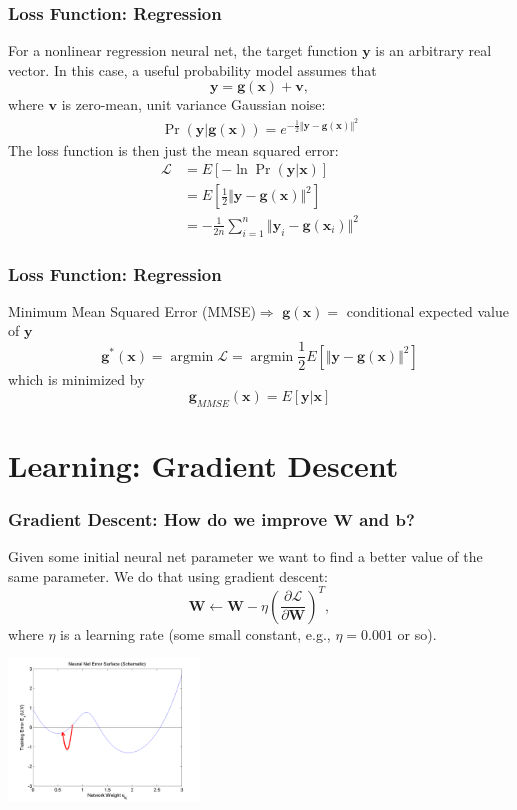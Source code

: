\documentclass{beamer}
\DeclareMathOperator*{\argmin}{argmin}
\begin{document}
\begin{frame}
  \frametitle{Loss Function: Regression}

  For a nonlinear regression neural net, the target function
  $\mathbf{y}$ is an arbitrary real vector.  In this case, a useful
  probability model assumes that
  \begin{displaymath}
    \mathbf{y}=\mathbf{g}(\mathbf{x})+\mathbf{v},
  \end{displaymath}
  where $\mathbf{v}$ is zero-mean, unit variance Gaussian noise:
  \begin{align*}
    \Pr(\mathbf{y}|\mathbf{g}(\mathbf{x}))=
    e^{-\frac{1}{2}\Vert\mathbf{y}-\mathbf{g}(\mathbf{x})\Vert^2}
  \end{align*}
  The loss function is then just the mean squared error:
  \begin{align*}
    \mathcal{L}
    &= E\left[-\ln\Pr(\mathbf{y}|\mathbf{x})\right]\\
    &= E\left[\frac{1}{2}\Vert\mathbf{y}-\mathbf{g}(\mathbf{x})\Vert^2\right]\\
    &= -\frac{1}{2n}\sum_{i=1}^n\Vert\mathbf{y}_i-\mathbf{g}(\mathbf{x}_i)\Vert^2
  \end{align*}
\end{frame}
  
\begin{frame}
  \frametitle{Loss Function: Regression}
  \begin{block}{Minimum Mean Squared Error (MMSE)$\Rightarrow$ $\mathbf{g}(\mathbf{x})=$ conditional expected value of $\mathbf{y}$}
    \[
    \mathbf{g}^*(\mathbf{x})=\argmin {\mathcal L} = 
    \argmin\frac{1}{2}E\left[\Vert\mathbf{y}-\mathbf{g}(\mathbf{x})\Vert^2\right]
    \]
    which is minimized by
    \[
    \mathbf{g}_{MMSE}(\mathbf{x})=E\left[\mathbf{y}|\mathbf{x}\right]
    \]
  \end{block}
\end{frame}

\section[Learning]{Learning: Gradient Descent}
\setcounter{subsection}{1}

\begin{frame}
  \frametitle{Gradient Descent: How do we improve $\mathbf{W}$ and $\mathbf{b}$?}  Given
  some initial neural net parameter
  we want to find a better value of the same parameter.  We do that
  using gradient descent:
  \[
  \mathbf{W}\leftarrow \mathbf{W}-\eta\left(\frac{\partial{\mathcal L}}{\partial\mathbf{W}}\right)^T,
  \]
  where $\eta$ is a learning rate (some small constant, e.g., $\eta=0.001$ or so).
  \centerline{\includegraphics[width=2in]{figs/nn_errorsurf1.png}}
\end{frame}
\end{document}

